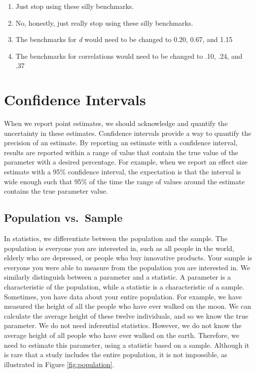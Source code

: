 \documentclass[
]{krantz}
\providecommand{\tightlist}{%
  \setlength{\itemsep}{0pt}\setlength{\parskip}{0pt}}
\begin{document}
\begin{enumerate}
\def\labelenumi{\Alph{enumi})}
\tightlist
\item
  Just stop using these silly benchmarks.
\item
  No, honestly, just really stop using these silly benchmarks.
\item
  The benchmarks for \emph{d} would need to be changed to 0.20, 0.67, and 1.15
\item
  The benchmarks for correlations would need to be changed to .10, .24, and .37
\end{enumerate}

\hypertarget{confint}{%
\chapter{Confidence Intervals}\label{confint}}

When we report point estimates, we should acknowledge and quantify the uncertainty in these estimates. Confidence intervals provide a way to quantify the precision of an estimate. By reporting an estimate with a confidence interval, results are reported within a range of value that contain the true value of the parameter with a desired percentage. For example, when we report an effect size estimate with a 95\% confidence interval, the expectation is that the interval is wide enough such that 95\% of the time the range of values around the estimate contains the true parameter value.

\hypertarget{population-vs.-sample}{%
\section{Population vs.~Sample}\label{population-vs.-sample}}

In statistics, we differentiate between the population and the sample. The population is everyone you are interested in, such as all people in the world, elderly who are depressed, or people who buy innovative products. Your sample is everyone you were able to measure from the population you are interested in. We similarly distinguish between a parameter and a statistic. A parameter is a characteristic of the population, while a statistic is a characteristic of a sample. Sometimes, you have data about your entire population. For example, we have measured the height of all the people who have ever walked on the moon. We can calculate the average height of these twelve individuals, and so we know the true parameter. We do not need inferential statistics. However, we do not know the average height of all people who have ever walked on the earth. Therefore, we need to estimate this parameter, using a statistic based on a sample. Although it is rare that a study includes the entire population, it is not impossible, as illustrated in Figure \ref{fig:population}.
\end{document}
